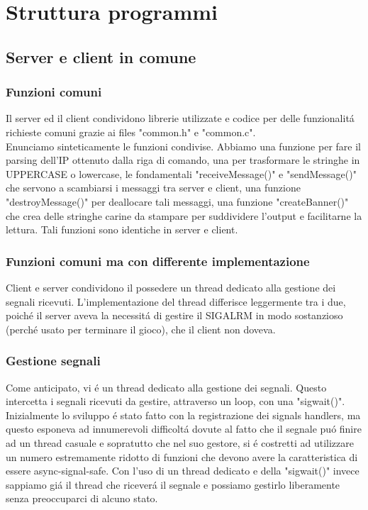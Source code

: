 \chapter{Struttura programmi}

\section{Server e client in comune}

\subsection{Funzioni comuni}

Il server ed il client condividono librerie utilizzate e codice per delle funzionalit\'a richieste comuni grazie ai files "common.h" e "common.c". 
\\
Enunciamo sinteticamente le funzioni condivise. Abbiamo una funzione per fare il parsing dell'IP ottenuto dalla riga di comando, una per trasformare le stringhe in UPPERCASE o lowercase, le fondamentali "receiveMessage()" e "sendMessage()" che servono a scambiarsi i messaggi tra server e client, una funzione "destroyMessage()" per deallocare tali messaggi, una funzione "createBanner()" che crea delle stringhe carine da stampare per suddividere l'output e facilitarne la lettura. Tali funzioni sono identiche in server e client.
 
 \subsection{Funzioni comuni ma con differente implementazione}

 Client e server condividono il possedere un thread dedicato alla gestione dei segnali ricevuti. L'implementazione del thread differisce leggermente tra i due, poich\'e il server aveva la necessit\'a di gestire il SIGALRM in modo sostanzioso (perch\'e usato per terminare il gioco), che il client non doveva.
  
\subsection{Gestione segnali}

Come anticipato, vi \'e un thread dedicato alla gestione dei segnali. Questo intercetta i segnali ricevuti da gestire, attraverso un loop, con una "sigwait()". Inizialmente lo sviluppo \'e stato fatto con la registrazione dei signals handlers, ma questo esponeva ad innumerevoli difficolt\'a dovute al fatto che il segnale pu\'o finire ad un thread casuale e sopratutto che nel suo gestore, si \'e costretti ad utilizzare un numero estremamente ridotto di funzioni che devono avere la caratteristica di essere async-signal-safe. Con l'uso di un thread dedicato e della "sigwait()" invece sappiamo gi\'a il thread che ricever\'a il segnale e possiamo gestirlo liberamente senza preoccuparci di alcuno stato.


